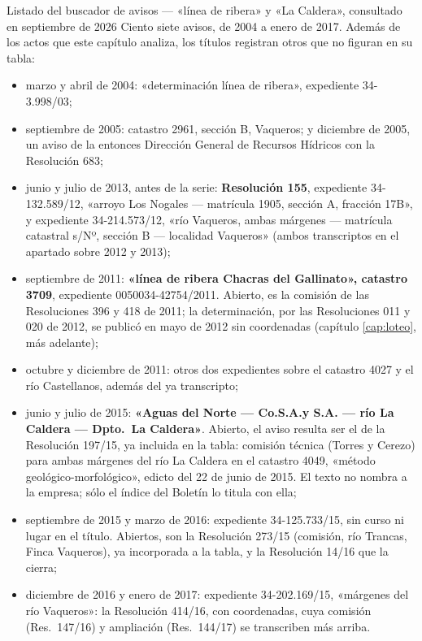 \begin{ficha}{Listado del buscador de avisos --- «línea de ribera» y «La Caldera», consultado en septiembre de 2026}
Ciento siete avisos, de 2004 a enero de 2017. Además de los actos que este capítulo analiza, los títulos registran otros que no figuran en su tabla:
\begin{itemize}[leftmargin=*,nosep]
\item marzo y abril de 2004: «determinación línea de ribera», expediente 34-3.998/03;
\item septiembre de 2005: catastro 2961, sección B, Vaqueros; y diciembre de 2005, un aviso de la entonces Dirección General de Recursos Hídricos con la Resolución 683;
\item junio y julio de 2013, antes de la serie: \textbf{Resolución 155}, expediente 34-132.589/12, «arroyo Los Nogales --- matrícula 1905, sección A, fracción 17B», y expediente 34-214.573/12, «río Vaqueros, ambas márgenes --- matrícula catastral s/Nº, sección B --- localidad Vaqueros» (ambos transcriptos en el apartado sobre 2012 y 2013);
\item septiembre de 2011: \textbf{«línea de ribera Chacras del Gallinato», catastro 3709}, expediente 0050034-42754/2011. Abierto, es la comisión de las Resoluciones 396 y 418 de 2011; la determinación, por las Resoluciones 011 y 020 de 2012, se publicó en mayo de 2012 sin coordenadas (capítulo \ref{cap:loteo}, más adelante);
\item octubre y diciembre de 2011: otros dos expedientes sobre el catastro 4027 y el río Castellanos, además del ya transcripto;
\item junio y julio de 2015: \textbf{«Aguas del Norte --- Co.S.A.y S.A. --- río La Caldera --- Dpto.\ La Caldera»}. Abierto, el aviso resulta ser el de la Resolución 197/15, ya incluida en la tabla: comisión técnica (Torres y Cerezo) para ambas márgenes del río La Caldera en el catastro 4049, «método geológico-morfológico», edicto del 22 de junio de 2015. El texto no nombra a la empresa; sólo el índice del Boletín lo titula con ella;
\item septiembre de 2015 y marzo de 2016: expediente 34-125.733/15, sin curso ni lugar en el título. Abiertos, son la Resolución 273/15 (comisión, río Trancas, Finca Vaqueros), ya incorporada a la tabla, y la Resolución 14/16 que la cierra;
\item diciembre de 2016 y enero de 2017: expediente 34-202.169/15, «márgenes del río Vaqueros»: la Resolución 414/16, con coordenadas, cuya comisión (Res.\ 147/16) y ampliación (Res.\ 144/17) se transcriben más arriba.
\end{itemize}
\end{ficha}

